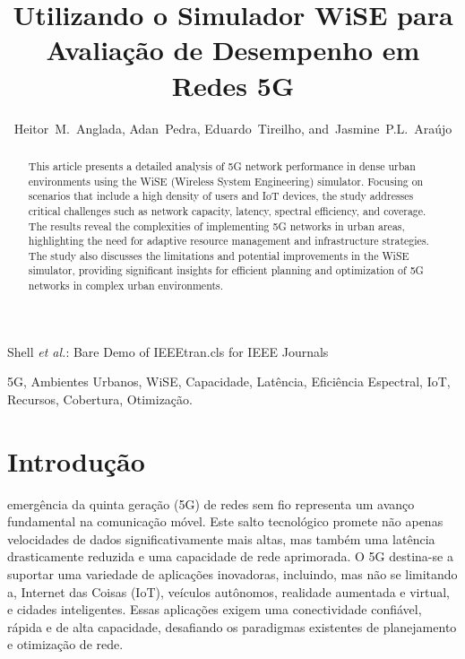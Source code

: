 \documentclass[journal]{IEEEtran}
\begin{document}
\title{Utilizando o Simulador WiSE para Avaliação de Desempenho em Redes 5G}


\author{Heitor~M.~Anglada, Adan~Pedra, Eduardo~Tireilho, and~Jasmine~P.L.~Araújo}



%
{Shell \MakeLowercase{\textit{et al.}}: Bare Demo of IEEEtran.cls for IEEE Journals}

\maketitle

\begin{abstract}
  This article presents a detailed analysis of 5G network performance in dense urban environments using the WiSE (Wireless System Engineering) simulator. Focusing on scenarios that include a high density of users and IoT devices, the study addresses critical challenges such as network capacity, latency, spectral efficiency, and coverage. The results reveal the complexities of implementing 5G networks in urban areas, highlighting the need for adaptive resource management and infrastructure strategies. The study also discusses the limitations and potential improvements in the WiSE simulator, providing significant insights for efficient planning and optimization of 5G networks in complex urban environments.

\end{abstract}

\begin{IEEEkeywords}
  5G, 
  Ambientes Urbanos,
  WiSE,
  Capacidade,
  Latência,
  Eficiência Espectral,
  IoT,
  Recursos,
  Cobertura,
  Otimização.
\end{IEEEkeywords}

\IEEEpeerreviewmaketitle



\section{Introdução}
 emergência da quinta geração (5G) de redes sem fio representa um avanço fundamental na comunicação móvel. Este salto tecnológico promete não apenas velocidades de dados significativamente mais altas, mas também uma latência drasticamente reduzida e uma capacidade de rede aprimorada. O 5G destina-se a suportar uma variedade de aplicações inovadoras, incluindo, mas não se limitando a, Internet das Coisas (IoT), veículos autônomos, realidade aumentada e virtual, e cidades inteligentes. Essas aplicações exigem uma conectividade confiável, rápida e de alta capacidade, desafiando os paradigmas existentes de planejamento e otimização de rede.
\end{document}

